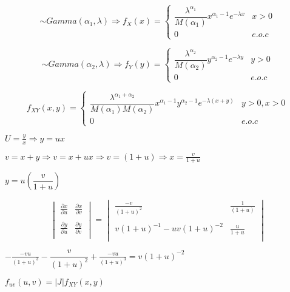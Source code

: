 \[
\sim Gamma \left( \alpha _{1},\lambda \right)\Rightarrow f_{X} \left(x \right)=
\begin{cases}
\dfrac{\lambda^{\alpha_{1}} }{M \left(\alpha_{1}\right)} x^{\alpha_{1}-1}e^{-\lambda x} & x>0 \\ 
0 & e.o.c
\end{cases}
\]

\[
\sim Gamma \left( \alpha _{2},\lambda \right)\Rightarrow f_{Y} \left(y \right)=
\begin{cases}
\dfrac{\lambda^{\alpha_{2}} }{M \left(\alpha_{2}\right)} y^{\alpha_{2}-1}e^{-\lambda y} & y>0 \\ 
0 & e.o.c
\end{cases}
\]

\[
 f_{XY} \left(x,y \right)=
\begin{cases}
\dfrac{\lambda^{\alpha_{1}+\alpha_{2} } }{M \left(\alpha_{1}\right)M \left(\alpha_{2}\right)} x^{\alpha_{1}-1} y^{\alpha_{2}-1}e^{-\lambda \left( x+y \right) } & y>0, x>0 \\ 
0 & e.o.c
\end{cases}
\]

$U=\frac{y}{x} \Rightarrow y=ux$

\smallskip

$v=x+y \Rightarrow v= x+ux \Rightarrow v= \left( 1+u \right) \Rightarrow x= \frac{v}{1+u}$

\smallskip

$y= u \left( \dfrac{v}{1+u}\right)$

\[
\begin{vmatrix}
\frac{\partial x}{\partial u} & \frac{\partial x}{\partial v} \\\\
\frac{\partial y}{\partial u} & \frac{\partial y}{\partial v}\\
\end{vmatrix} = \begin{vmatrix}
\frac{-v}{\left(1+u \right)^{2} } & \frac{1}{\left(1+u \right)} \\\\
v\left(1+u \right)^{-1}-uv \left(1+u \right)^{-2} & \frac{u}{1+u}\\
\end{vmatrix}
\]


$-\frac{-vu}{\left( 1+u \right)^{3}}-\dfrac{v}{\left(1+u \right)^{2}}+ \frac{-vu}{\left(1+u \right)^{3}}= v \left(1+u \right)^{-2}$

 \smallskip
 
$f_{uv} \left(u,v \right) = |J| f_{XY}\left(x,y \right)$

